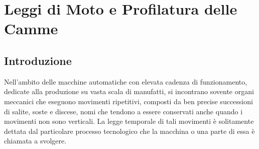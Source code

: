 \chapter{Leggi di Moto e Profilatura delle Camme}
\label{camme}

\section{Introduzione}

\noindent Nell'ambito delle macchine automatiche con elevata cadenza di funzionamento,
dedicate alla produzione su vasta scala di manufatti,
si incontrano sovente organi meccanici che eseguono movimenti ripetitivi,
composti da ben precise successioni di salite, soste e discese, nomi che tendono a essere
conservati anche quando i movimenti non sono verticali. La legge temporale di tali
movimenti \`e  solitamente
dettata dal particolare processo tecnologico che la macchina o una parte di essa
\`e chiamata a svolgere.
